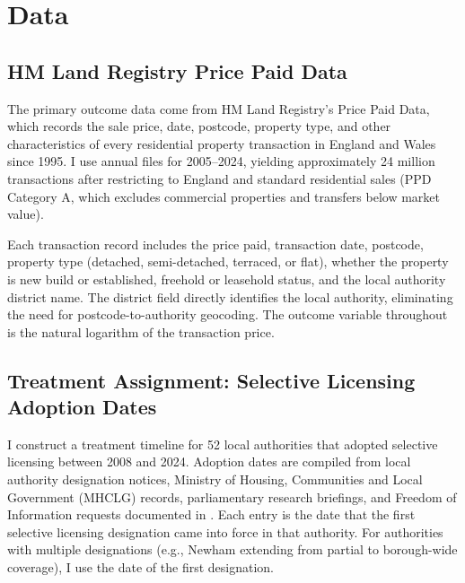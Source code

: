 \documentclass[12pt]{article}
\begin{document}
\section{Data}
\label{sec:data}

\subsection{HM Land Registry Price Paid Data}

The primary outcome data come from HM Land Registry's Price Paid Data, which records the sale price, date, postcode, property type, and other characteristics of every residential property transaction in England and Wales since 1995. I use annual files for 2005--2024, yielding approximately 24 million transactions after restricting to England and standard residential sales (PPD Category A, which excludes commercial properties and transfers below market value).

Each transaction record includes the price paid, transaction date, postcode, property type (detached, semi-detached, terraced, or flat), whether the property is new build or established, freehold or leasehold status, and the local authority district name. The district field directly identifies the local authority, eliminating the need for postcode-to-authority geocoding. The outcome variable throughout is the natural logarithm of the transaction price.

\subsection{Treatment Assignment: Selective Licensing Adoption Dates}

I construct a treatment timeline for 52 local authorities that adopted selective licensing between 2008 and 2024. Adoption dates are compiled from local authority designation notices, Ministry of Housing, Communities and Local Government (MHCLG) records, parliamentary research briefings, and Freedom of Information requests documented in \citet{petersen2026selective}. Each entry is the date that the first selective licensing designation came into force in that authority. For authorities with multiple designations (e.g., Newham extending from partial to borough-wide coverage), I use the date of the first designation.
\end{document}
